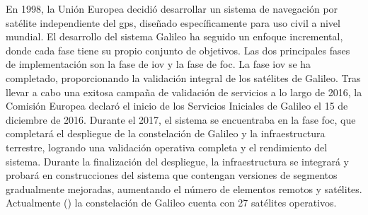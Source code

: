 \begin{justify}
    En 1998, la Unión Europea decidió desarrollar un sistema de navegación por satélite independiente del \gls{gps}, diseñado específicamente
    para uso civil a nivel mundial. El desarrollo del sistema Galileo ha seguido un enfoque incremental, donde cada fase tiene su propio conjunto de objetivos. Las dos principales
    fases de implementación son la fase de \gls{iov} y la fase de \gls{foc}. La fase \gls{iov} se ha completado, proporcionando la validación
    integral de los satélites de Galileo. Tras llevar a cabo una exitosa campaña de validación de servicios a lo largo de 2016, la Comisión
    Europea declaró el inicio de los Servicios Iniciales de Galileo el 15 de diciembre de 2016. Durante el 2017, el sistema se encuentraba en la fase \gls{foc}, que completará el
    despliegue de la constelación de Galileo y la infraestructura terrestre, logrando una validación operativa completa y el rendimiento del sistema. Durante la finalización
    del despliegue, la infraestructura se integrará y probará en construcciones del sistema que contengan versiones de segmentos gradualmente mejoradas, aumentando el número
    de elementos remotos y satélites. Actualmente () la constelación de Galileo cuenta con 27 satélites operativos.
\end{justify}